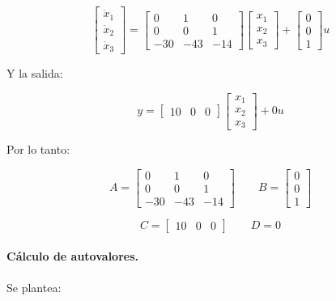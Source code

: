 \documentclass[12pt,a4paper]{article}
\begin{document}
\begin{equation}\begin{bmatrix}\dot{x}_1\\\dot{x}_2\\\dot{x}_3\end{bmatrix}=\begin{bmatrix}0&1&0\\0&0&1\\-30&-43&-14\end{bmatrix} \begin{bmatrix}x_1\\x_2\\x_3\end{bmatrix}+\begin{bmatrix}0\\0\\1\end{bmatrix}u\end{equation}

Y la salida:

\begin{equation}y=\begin{bmatrix}10&0&0\end{bmatrix} \begin{bmatrix}x_1\\x_2\\x_3\end{bmatrix}+0u\end{equation}

Por lo tanto:

\begin{equation}\boxed{A=\begin{bmatrix}0&1&0\\0&0&1\\-30&-43&-14\end{bmatrix} \qquad B=\begin{bmatrix}0\\0\\1\end{bmatrix}}\end{equation}

\begin{equation}\boxed{C=\begin{bmatrix}10&0&0\end{bmatrix} \qquad D=0}\end{equation}
\paragraph{Cálculo de autovalores.} Se plantea:
\end{document}
